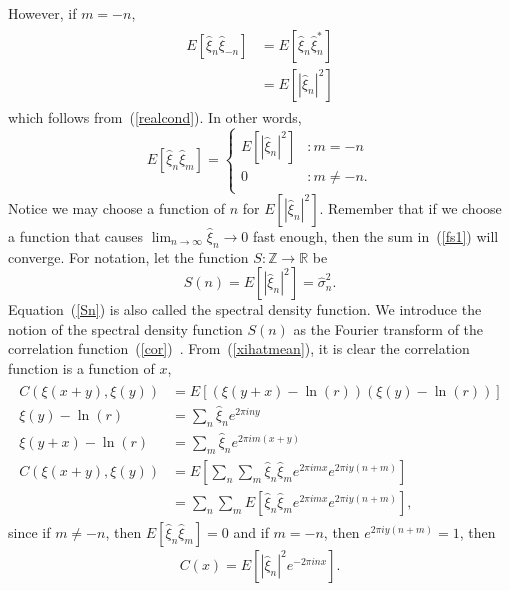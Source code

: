 However, if $m=-n$, 
\begin{align*}
\begin{split}
E[\hat{\xi}_n\hat{\xi}_{-n}]&= E[\hat{\xi}_n\hat{\xi}_n^*]\\
&=E[|\hat{\xi}_n|^2]
\end{split}
\end{align*}
which follows from~(\ref{realcond}). In other words,
\begin{displaymath}
E[\hat{\xi}_n\hat{\xi}_m] = \left\{
     \begin{array}{lr}
       E[|\hat{\xi}_n|^2] & : m = -n\\
       0 & : m \neq -n.\\
     \end{array}
   \right.
\end{displaymath} 
Notice we may choose a function of $n$ for
$E[|\hat{\xi}_n|^2]$. Remember that if we choose a function that
causes $\lim_{n \to \infty}\hat{\xi}_n \to 0$ fast enough, then the sum in~(\ref{fs1}) will
converge. For notation, let the function $S:\mathbb{Z} \to \mathbb{R}$ be
\begin{equation}\label{Sn}
S(n) = E[|\hat{\xi}_n|^2] = \hat{\sigma}_n^2.
\end{equation}
Equation~(\ref{Sn}) is also called the spectral density function. We introduce the notion of the spectral density function $S(n)$ as the Fourier transform
of the correlation
function~(\ref{cor})~\cite{gelhar}. From~(\ref{xihatmean}), it is
clear the correlation function is a function of $x$,
\begin{align*}
\begin{split}
C(\xi(x+y),\xi(y)) &= E[(\xi(y+x) -\ln(r))(\xi(y)-\ln(r))]\\
\xi(y) - \ln(r) &= \sum_n\hat{\xi}_ne^{2\pi iny}\\
\xi(y+x) - \ln(r) &= \sum_m\hat{\xi}_ne^{2\pi im(x+y)}\\
C(\xi(x+y),\xi(y)) &= E\left[\sum_n\sum_m \hat{\xi}_n\hat{\xi}_m e^{2\pi
  imx}e^{2\pi iy(n+m)}\right]\\
&= \sum_n\sum_m E\left[\hat{\xi}_n\hat{\xi}_m e^{2\pi
  imx}e^{2\pi iy(n+m)}\right],
\end{split}
\end{align*}
since if $m \neq -n$, then $E[\hat{\xi}_n\hat{\xi}_m]=0$ and if $m =-n$, then $e^{2\pi
  iy(n+m)}=1$, then
\begin{align*}
C(x) = E[|\hat{\xi}_n|^2 e^{-2\pi inx}].
\end{align*}
